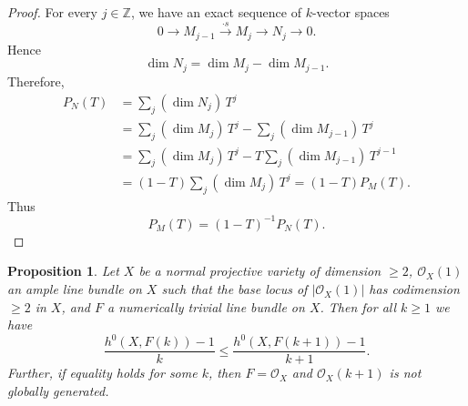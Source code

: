 \documentclass[11pt,letterpaper]{amsart}
\newtheorem{proposition}[lemma]{Proposition}
\begin{document}
\begin{proof}
For every $j\in\mathbb{Z}$, we have an exact sequence of $k$-vector spaces
\[
0\longrightarrow M_{j-1}
\xrightarrow{\cdot s}
M_j
\longrightarrow N_j
\longrightarrow0.
\]
Hence
\[
\dim N_j=\dim M_j-\dim M_{j-1}.
\]
Therefore,
\begin{align*}
P_N(T)
&=\sum_j(\dim N_j)\,T^j \\
&=\sum_j(\dim M_j)\,T^j-\sum_j(\dim M_{j-1})\,T^j \\
&=\sum_j(\dim M_j)\,T^j
-T\sum_j(\dim M_{j-1})\,T^{j-1} \\
&=(1-T)\sum_j(\dim M_j)\,T^j 
=(1-T)P_M(T).
\end{align*}
Thus
\[
P_M(T)=(1-T)^{-1}P_N(T).
\]
\end{proof}
\begin{proposition}\label{monotone}
Let $X$ be a normal projective variety of dimension $\geq 2$,
$\mathcal{O}_X(1)$ an ample line bundle on $X$ such that the base locus of $|\mathcal{O}_X(1)|$ has codimension $\geq 2$ in $X$, and $F$ a numerically trivial line bundle on $X$.
Then for all $k\geq 1$ we have
$$\frac{h^0(X,F(k))-1}{k}\leq \frac{h^0(X,F(k+1))-1}{k+1}.$$
Further, if equality holds for some $k$, then $F=\mathcal{O}_X$ and $\mathcal{O}_X(k+1)$ is not globally generated.
\end{proposition}
\end{document}
